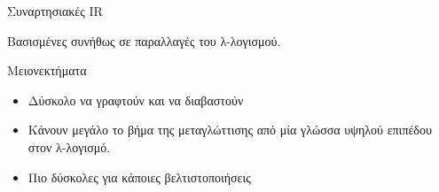\documentclass[10pt]{beamer}
\begin{document}
\begin{frame}{Συναρτησιακές IR}

Βασισμένες συνήθως σε παραλλαγές του λ-λογισμού.

    \begin{alertblock}{Μειονεκτήματα}
	\begin{itemize}[]
	    \item Δύσκολο να γραφτούν και να διαβαστούν
	    \item Κάνουν μεγάλο το βήμα της μεταγλώττισης από μία γλώσσα υψηλού επιπέδου στον λ-λογισμό.
	    \item Πιο δύσκολες για κάποιες βελτιστοποιήσεις
	\end{itemize}
	\end{alertblock}
\end{frame}
\end{document}
